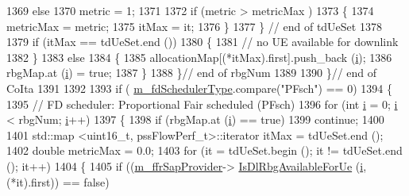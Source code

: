 \begin{DoxyCode}
1369                       \textcolor{keywordflow}{else}
1370                         metric = 1;
1371         
1372                       \textcolor{keywordflow}{if} (metric > metricMax )
1373                         \{
1374                           metricMax = metric;
1375                           itMax = it;
1376                         \}
1377                     \} \textcolor{comment}{// end of tdUeSet}
1378 
1379                   \textcolor{keywordflow}{if} (itMax == tdUeSet.end ())
1380                     \{
1381                       \textcolor{comment}{// no UE available for downlink}
1382                     \}
1383                   \textcolor{keywordflow}{else}
1384                     \{
1385                       allocationMap[(*itMax).first].push\_back (\hyperlink{bernuolliDistribution_8m_a6f6ccfcf58b31cb6412107d9d5281426}{i});
1386                       rbgMap.at (\hyperlink{bernuolliDistribution_8m_a6f6ccfcf58b31cb6412107d9d5281426}{i}) = \textcolor{keyword}{true};
1387                     \}
1388                 \}\textcolor{comment}{// end of rbgNum}
1389         
1390             \}\textcolor{comment}{// end of CoIta}
1391         
1392         
1393           \textcolor{keywordflow}{if} ( \hyperlink{classns3_1_1PssFfMacScheduler_a8442a089f3cb7fcaf802fb5da9caee02}{m\_fdSchedulerType}.compare(\textcolor{stringliteral}{"PFsch"}) == 0)
1394             \{
1395               \textcolor{comment}{// FD scheduler: Proportional Fair scheduled (PFsch)}
1396               \textcolor{keywordflow}{for} (\textcolor{keywordtype}{int} \hyperlink{bernuolliDistribution_8m_a6f6ccfcf58b31cb6412107d9d5281426}{i} = 0; \hyperlink{bernuolliDistribution_8m_a6f6ccfcf58b31cb6412107d9d5281426}{i} < rbgNum; \hyperlink{bernuolliDistribution_8m_a6f6ccfcf58b31cb6412107d9d5281426}{i}++)
1397                 \{
1398                   \textcolor{keywordflow}{if} (rbgMap.at (\hyperlink{bernuolliDistribution_8m_a6f6ccfcf58b31cb6412107d9d5281426}{i}) == \textcolor{keyword}{true})
1399                     \textcolor{keywordflow}{continue};
1400 
1401                   std::map <uint16\_t, pssFlowPerf\_t>::iterator itMax = tdUeSet.end ();
1402                   \textcolor{keywordtype}{double} metricMax = 0.0;
1403                   \textcolor{keywordflow}{for} (it = tdUeSet.begin (); it != tdUeSet.end (); it++)
1404                     \{
1405                       \textcolor{keywordflow}{if} ((\hyperlink{classns3_1_1PssFfMacScheduler_a8b7889293dd002f806e2d6afd9c50aed}{m\_ffrSapProvider}->
      \hyperlink{classns3_1_1LteFfrSapProvider_a91f4de3c794d2a32fae5bcfafd88b6fa}{IsDlRbgAvailableForUe} (\hyperlink{bernuolliDistribution_8m_a6f6ccfcf58b31cb6412107d9d5281426}{i}, (*it).first)) == \textcolor{keyword}{false})

\end{DoxyCode}
